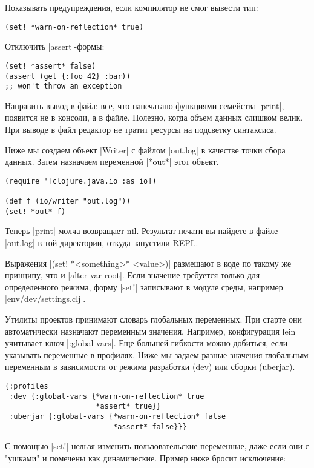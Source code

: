 Показывать предупреждения, если компилятор не смог вывести тип:

\begin{verbatim}
(set! *warn-on-reflection* true)
\end{verbatim}

Отключить \spverb|assert|-формы:

\begin{verbatim}
(set! *assert* false)
(assert (get {:foo 42} :bar))
;; won't throw an exception
\end{verbatim}

Направить вывод в файл: все, что напечатано функциями семейства \spverb|print|,
появится не в консоли, а в файле. Полезно, когда объем данных слишком велик. При
выводе в файл редактор не тратит ресурсы на подсветку синтаксиса.

Ниже мы создаем объект \spverb|Writer| с файлом \spverb|out.log| в качестве точки сбора
данных. Затем назначаем переменной \spverb|*out*| этот объект.

\begin{verbatim}
(require '[clojure.java.io :as io])

(def f (io/writer "out.log"))
(set! *out* f)
\end{verbatim}

Теперь \spverb|print| молча возвращает nil. Результат печати вы найдете в файле
\spverb|out.log| в той директории, откуда запустили REPL.

Выражения \spverb|(set! *<something>* <value>)| размещают в коде по такому же принципу,
что и \spverb|alter-var-root|. Если значение требуется только для определенного режима,
форму \spverb|set!| записывают в модуле среды, например \spverb|env/dev/settings.clj|.

Утилиты проектов принимают словарь глобальных переменных. При старте они
автоматически назначают переменным значения. Например, конфигурация lein
учитывает ключ \spverb|:global-vars|. Еще большей гибкости можно добиться, если
указывать переменные в профилях. Ниже мы задаем разные значения глобальным
переменным в зависимости от режима разработки (dev) или сборки (uberjar).

\begin{verbatim}
{:profiles
 :dev {:global-vars {*warn-on-reflection* true
                     *assert* true}}
 :uberjar {:global-vars {*warn-on-reflection* false
                         *assert* false}}}
\end{verbatim}

С помощью \spverb|set!| нельзя изменить пользовательские переменные, даже если они с
"ушками" и помечены как динамические. Пример ниже бросит исключение:

